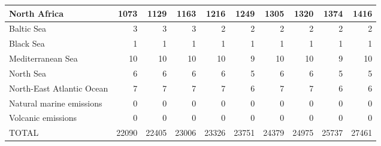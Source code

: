 \begin{table}
\begin{tabular}{|l|r|r|r|r|r|r|r|r|r|}
                  North Africa&   1073&   1129&   1163&   1216&   1249&   1305&   1320&   1374&   1416\\\hline
                    Baltic Sea&      3&      3&      3&      2&      2&      2&      2&      2&      2\\\hline
                     Black Sea&      1&      1&      1&      1&      1&      1&      1&      1&      1\\\hline
             Mediterranean Sea&     10&     10&     10&     10&      9&     10&     10&      9&     10\\\hline
                     North Sea&      6&      6&      6&      6&      5&      6&      6&      5&      5\\\hline
     North-East Atlantic Ocean&      7&      7&      7&      7&      6&      7&      7&      6&      6\\\hline
      Natural marine emissions&      0&      0&      0&      0&      0&      0&      0&      0&      0\\\hline
            Volcanic emissions&      0&      0&      0&      0&      0&      0&      0&      0&      0\\\hline\hline
                         TOTAL&  22090&  22405&  23006&  23326&  23751&  24379&  24975&  25737&  27461\\\hline
 \end{tabular}
 \end{table}
 
 

